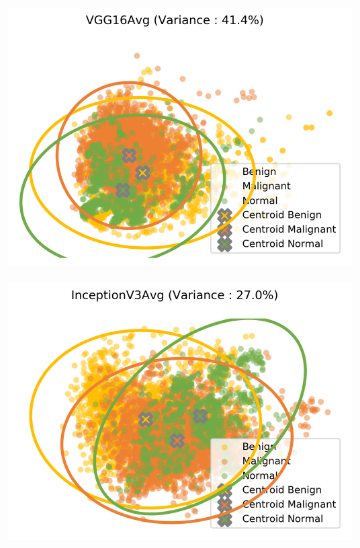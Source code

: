 \begin{figure}[H]
    \centering
    \begin{subfigure}{.2\textwidth}
      \includegraphics[width=\textwidth]{contents/chapter_4/resources/visualisation_transfer_VGG16Avg.png}
    \end{subfigure}
    \begin{subfigure}{.2\textwidth}
      \includegraphics[width=\textwidth]{contents/chapter_4/resources/visualisation_transfer_InceptionV3Avg.png}
    \end{subfigure}
    \begin{subfigure}{.2\textwidth}

\end{subfigure}
\end{figure}
